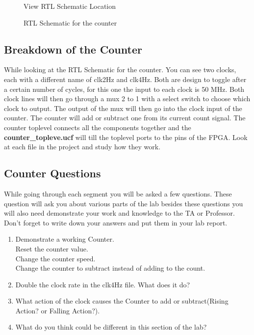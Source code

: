 \documentclass{article}
\begin{document}
\begin{figure}[!htb]
  \centering
  \caption{View RTL Schematic Location}
\end{figure}

\begin{figure}[!htb]
  \centering
  \caption{RTL Schematic for the counter}
\end{figure}

\subsection{Breakdown of the Counter}
While looking at the RTL Schematic for the counter. You can see two clocks, each with a different name of clk2Hz  and clk4Hz. Both are design to toggle after a certain number of cycles, for this one the input to each clock is 50 MHz. Both clock lines will then go through a mux 2 to 1 with a select switch to choose which clock to output. The output of the mux will then go into the clock input of the counter. The counter will add or subtract one from its current count signal. The counter toplevel connects all the components together and the \textbf{counter\_topleve.ucf} will till the toplevel ports to the pins of the FPGA. Look at each file in the project and study how they work.

\subsection{Counter Questions}
While going through each segment you will be asked a few questions. These question will ask you about various parts of the lab besides these questions you will also need demonstrate your work and knowledge to the TA or Professor. Don't forget to write down your answers and put them in your lab report.

\begin{enumerate}
  \item Demonstrate a working Counter. \hfill \\
  Reset the counter value.\\
  Change the counter speed.\\
  Change the counter to subtract instead of adding to the count.
  \item Double the clock rate in the clk4Hz file. What does it do?
  \item What action of the clock causes the Counter to add or subtract(Rising Action? or Falling Action?).
  \item What do you think could be different in this section of the lab?
\end{enumerate}
\end{document}
